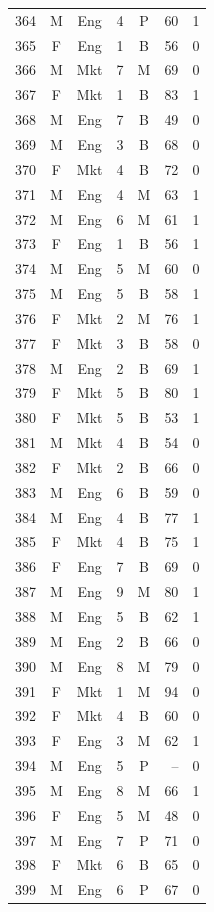 \documentclass[11pt,a4paper]{article}
\begin{document}
\begin{center}
\begin{tabular}[t]{@{}r c c r c r c@{}}
364 & M & Eng & 4 & P & 60 & 1 \\
365 & F & Eng & 1 & B & 56 & 0 \\
366 & M & Mkt & 7 & M & 69 & 0 \\
367 & F & Mkt & 1 & B & 83 & 1 \\
368 & M & Eng & 7 & B & 49 & 0 \\
369 & M & Eng & 3 & B & 68 & 0 \\
370 & F & Mkt & 4 & B & 72 & 0 \\
371 & M & Eng & 4 & M & 63 & 1 \\
372 & M & Eng & 6 & M & 61 & 1 \\
373 & F & Eng & 1 & B & 56 & 1 \\
374 & M & Eng & 5 & M & 60 & 0 \\
375 & M & Eng & 5 & B & 58 & 1 \\
376 & F & Mkt & 2 & M & 76 & 1 \\
377 & F & Mkt & 3 & B & 58 & 0 \\
378 & M & Eng & 2 & B & 69 & 1 \\
379 & F & Mkt & 5 & B & 80 & 1 \\
380 & F & Mkt & 5 & B & 53 & 1 \\
381 & M & Mkt & 4 & B & 54 & 0 \\
382 & F & Mkt & 2 & B & 66 & 0 \\
383 & M & Eng & 6 & B & 59 & 0 \\
384 & M & Eng & 4 & B & 77 & 1 \\
385 & F & Mkt & 4 & B & 75 & 1 \\
386 & F & Eng & 7 & B & 69 & 0 \\
387 & M & Eng & 9 & M & 80 & 1 \\
388 & M & Eng & 5 & B & 62 & 1 \\
389 & M & Eng & 2 & B & 66 & 0 \\
390 & M & Eng & 8 & M & 79 & 0 \\
391 & F & Mkt & 1 & M & 94 & 0 \\
392 & F & Mkt & 4 & B & 60 & 0 \\
393 & F & Eng & 3 & M & 62 & 1 \\
394 & M & Eng & 5 & P & -- & 0 \\
395 & M & Eng & 8 & M & 66 & 1 \\
396 & F & Eng & 5 & M & 48 & 0 \\
397 & M & Eng & 7 & P & 71 & 0 \\
398 & F & Mkt & 6 & B & 65 & 0 \\
399 & M & Eng & 6 & P & 67 & 0 \\

\end{tabular}
\end{center}
\end{document}
